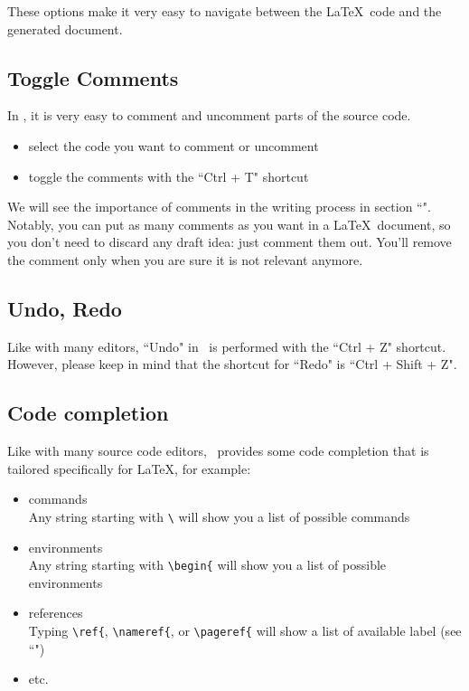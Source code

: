 These options make it very easy to navigate between the \LaTeX\ code and the generated document.



\bigskip

\subsection{Toggle Comments}

In \TeXstudio, it is very easy to comment and uncomment parts of the source code.

\begin{itemize}
	\item select the code you want to comment or uncomment
	\item toggle the comments with the ``Ctrl + T" shortcut
\end{itemize}

We will see the importance of comments in the writing process in section ``". Notably, you can put as many comments as you want in a \LaTeX\ document, so you don't need to discard any draft idea: just comment them out. You'll remove the comment only when you are sure it is not relevant anymore.

\bigskip


\subsection{Undo, Redo}

Like with many editors, ``Undo" in \TeXstudio\ is performed with the ``Ctrl + Z" shortcut. \\
However, please keep in mind that the shortcut for ``Redo" is ``Ctrl + Shift + Z". \\


\bigskip

\subsection{Code completion}

Like with many source code editors, \TeXstudio\ provides some code completion that is tailored specifically for \LaTeX, for example:
\begin{itemize}
	\item commands \\
	Any string starting with \texttt{\textbackslash} will show you a list of possible commands
	
	\item environments \\
	Any string starting with \texttt{\textbackslash begin\{} will show you a list of possible environments
	
	\item references\\
	Typing \texttt{\textbackslash ref\{}, \texttt{\textbackslash nameref\{}, or \texttt{\textbackslash pageref\{} will show a list of available label (see ``")
	
	\item etc.
\end{itemize}




